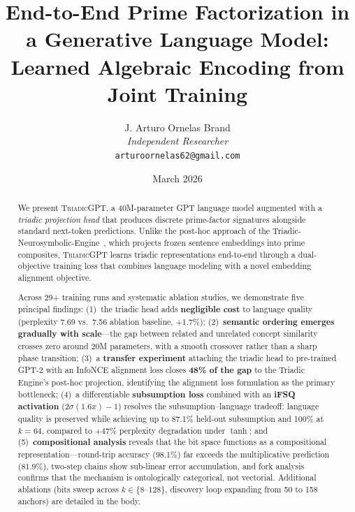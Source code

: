 \documentclass[11pt,a4paper]{article}
\title{
    \textbf{End-to-End Prime Factorization in a Generative Language Model: \\
    Learned Algebraic Encoding from Joint Training}
}
\author{
    J. Arturo Ornelas Brand \\
    \textit{Independent Researcher} \\
    \texttt{arturoornelas62@gmail.com}
}
\date{March 2026}
\newcommand{\microgpt}{\textsc{TriadicGPT}}
\begin{document}

\maketitle

\begin{abstract}

We present \microgpt{}, a 40M-parameter GPT language model augmented with a \emph{triadic projection head} that produces discrete prime-factor signatures alongside standard next-token predictions.
Unlike the post-hoc approach of the Triadic-Neurosymbolic-Engine~\citep{ornelas2026prime}, which projects frozen sentence embeddings into prime composites, \microgpt{} learns triadic representations end-to-end through a dual-objective training loss that combines language modeling with a novel embedding alignment objective.

Across 29+ training runs and systematic ablation studies, we demonstrate five principal findings:
(1)~the triadic head adds \textbf{negligible cost} to language quality (perplexity 7.69 vs.\ 7.56 ablation baseline, $+1.7\%$);
(2)~\textbf{semantic ordering emerges gradually with scale}---the gap between related and unrelated concept similarity crosses zero around 20M parameters, with a smooth crossover rather than a sharp phase transition;
(3)~a \textbf{transfer experiment} attaching the triadic head to pre-trained GPT-2 with an InfoNCE alignment loss closes \textbf{48\% of the gap} to the Triadic Engine's post-hoc projection, identifying the alignment loss formulation as the primary bottleneck;
(4)~a differentiable \textbf{subsumption loss} combined with an \textbf{iFSQ activation} ($2\sigma(1.6x)-1$) resolves the subsumption--language tradeoff: language quality is preserved while achieving up to 87.1\% held-out subsumption and 100\% at $k=64$, compared to $+47\%$ perplexity degradation under $\tanh$;
and (5)~\textbf{compositional analysis} reveals that the bit space functions as a compositional representation---round-trip accuracy (98.1\%) far exceeds the multiplicative prediction (81.9\%), two-step chains show sub-linear error accumulation, and fork analysis confirms that the mechanism is ontologically categorical, not vectorial.
Additional ablations (bits sweep across $k \in \{8$--$128\}$, discovery loop expanding from 50 to 158 anchors) are detailed in the body.


\end{abstract}
\end{document}

